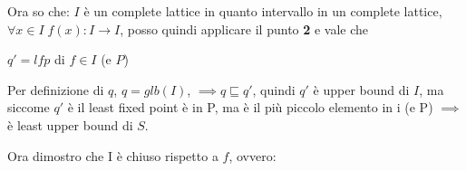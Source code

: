 \documentclass{article}
\begin{document}
Ora so che: $I$ è un complete lattice in quanto intervallo in un complete lattice, $\forall x \in I \; f(x):I \to I$, posso quindi applicare il punto \textbf{2} e vale che 
\begin{center}
$q'=lfp$ di $f \in I$ (e $P$)
\end{center}

Per definizione di $q$, $q=glb(I)$, $\implies q \sqsubseteq q'$, quindi $q'$ è upper bound di $I$, ma siccome $q'$ è il least fixed point è in P, ma è il più piccolo elemento in i (e P) $\implies$ è least upper bound di $S$.
\begin{comment}
\section{Proof2}
1 Sia $ S \subseteq P$ e $ s = \sqcup S$ (least upper bound di S), dimostro che esiste un elemento di P che è maggiore di tutti gli elementi di S, e che tale elemento è il più piccolo elemento di P (comunque più grande di S).

Definisco $U = \{ x\in P| s \sqsubseteq x\}$ ovvero l'insieme degli elementi più grandi di $s$ in $P$ (upper closure). $U$ è quindi l'intervallo degli elementi da $s$ al Top element di $L$: $U=[s....\top]$. Si ha che $s \in U$.
\end{comment}
Ora dimostro che I è chiuso rispetto a $f$, ovvero:
\end{document}
